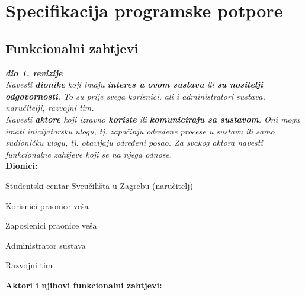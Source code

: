 \chapter{Specifikacija programske potpore}

\section{Funkcionalni zahtjevi}

\textbf{\textit{dio 1. revizije}}\\

\textit{Navesti \textbf{dionike} koji imaju \textbf{interes u ovom sustavu} ili  \textbf{su nositelji odgovornosti}. To su prije svega korisnici, ali i administratori sustava, naručitelji, razvojni tim.}\\

\textit{Navesti \textbf{aktore} koji izravno \textbf{koriste} ili \textbf{komuniciraju sa sustavom}. Oni mogu imati inicijatorsku ulogu, tj. započinju određene procese u sustavu ili samo sudioničku ulogu, tj. obavljaju određeni posao. Za svakog aktora navesti funkcionalne zahtjeve koji se na njega odnose.}\\


\noindent \textbf{Dionici:}

\begin{packed_enum}
	
	\item Studentski centar Sveučilišta u Zagrebu (naručitelj)
	\item Korisnici praonice veša				
	\item Zaposlenici praonice veša
	\item Administrator sustava
	\item Razvojni tim
	
\end{packed_enum}

\noindent \textbf{Aktori i njihovi funkcionalni zahtjevi:}


